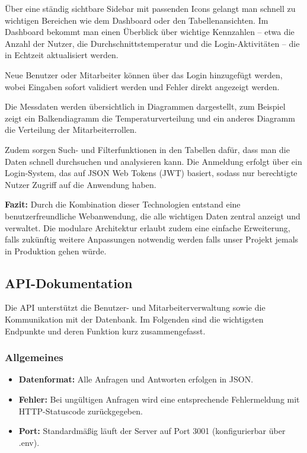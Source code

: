 Über eine ständig sichtbare Sidebar mit passenden Icons gelangt man schnell zu wichtigen Bereichen wie dem Dashboard oder den Tabellenansichten. Im Dashboard bekommt man einen Überblick über wichtige Kennzahlen – etwa die Anzahl der Nutzer, die Durchschnittstemperatur und die Login-Aktivitäten – die in Echtzeit aktualisiert werden. 

\vspace{1em}
\noindent Neue Benutzer oder Mitarbeiter können über das Login hinzugefügt werden, wobei Eingaben sofort validiert werden und Fehler direkt angezeigt werden. 

\vspace{1em}
\noindent Die Messdaten werden übersichtlich in Diagrammen dargestellt, zum Beispiel zeigt ein Balkendiagramm die Temperaturverteilung und ein anderes Diagramm die Verteilung der Mitarbeiterrollen.

\vspace{1em}
\noindent Zudem sorgen Such- und Filterfunktionen in den Tabellen dafür, dass man die Daten schnell durchsuchen und analysieren kann. Die Anmeldung erfolgt über ein Login-System, das auf JSON Web Tokens (JWT) basiert, sodass nur berechtigte Nutzer Zugriff auf die Anwendung haben.

\vspace{1em}
\noindent\textbf{Fazit:}\newline
Durch die Kombination dieser Technologien entstand eine benutzerfreundliche Webanwendung, die alle wichtigen Daten zentral anzeigt und verwaltet. Die modulare Architektur erlaubt zudem eine einfache Erweiterung, falls zukünftig weitere Anpassungen notwendig werden falls unser Projekt jemals in Produktion gehen würde.


\subsection{API-Dokumentation}
\label{subsec:api-dokumentation}

Die API unterstützt die Benutzer- und Mitarbeiterverwaltung sowie die Kommunikation mit der Datenbank. Im Folgenden sind die wichtigsten Endpunkte und deren Funktion kurz zusammengefasst.


\subsubsection{Allgemeines}

\begin{itemize}
    \item \textbf{Datenformat: }Alle Anfragen und Antworten erfolgen in JSON.
    \item \textbf{Fehler: }Bei ungültigen Anfragen wird eine entsprechende Fehlermeldung mit HTTP-Statuscode zurückgegeben.
    \item \textbf{Port: }Standardmäßig läuft der Server auf Port 3001 (konfigurierbar über .env).
\end{itemize}


